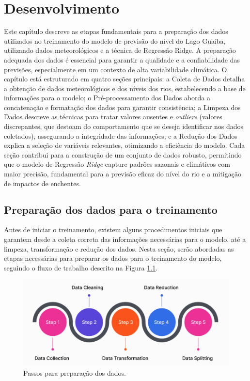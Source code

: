\chapter{Desenvolvimento}

Este capítulo descreve as etapas fundamentais para a preparação dos dados utilizados no treinamento do modelo de previsão do nível do Lago Guaíba, utilizando dados meteorológicos e a técnica de Regressão Ridge. A preparação adequada dos dados é essencial para garantir a qualidade e a confiabilidade das previsões, especialmente em um contexto de alta variabilidade climática. O capítulo está estruturado em quatro seções principais: a Coleta de Dados detalha a obtenção de dados meteorológicos e dos níveis dos rios, estabelecendo a base de informações para o modelo; o Pré-processamento dos Dados aborda a concatenação e formatação dos dados para garantir consistência; a Limpeza dos Dados descreve as técnicas para tratar valores ausentes e \textit{outliers} (valores discrepantes, que destoam do comportamento que se deseja identificar nos dados coletados), assegurando a integridade das informações; e a Redução dos Dados explica a seleção de variáveis relevantes, otimizando a eficiência do modelo. Cada seção contribui para a construção de um conjunto de dados robusto, permitindo que o modelo de Regressão \textit{Ridge} capture padrões sazonais e climáticos com maior precisão, fundamental para a previsão eficaz do nível do rio e a mitigação de impactos de enchentes.

\section{Preparação dos dados para o treinamento}

Antes de iniciar o treinamento, existem alguns procedimentos iniciais que garantem desde a coleta correta das informações necessárias para o modelo, até a limpeza, transformação e redução dos dados. Nesta seção, serão abordadas as etapas necessárias para preparar os dados para o treinamento do modelo, seguindo o fluxo de trabalho descrito na Figura \ref{fig:passos_preparacao}.

\begin{figure}[H]
	\caption{\label{fig:passos_preparacao}Passos para preparação dos dados.}
	\begin{center}
		\includegraphics[scale=0.4]{figuras/steps_data_preparing.png}
	\end{center}
\end{figure}

